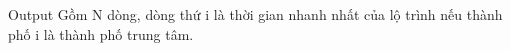 Output
Gồm N dòng, dòng thứ i là thời gian nhanh nhất của lộ trình nếu thành phố i là thành phố trung tâm.